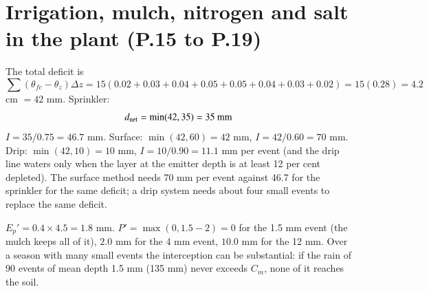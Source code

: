 \section{Irrigation, mulch, nitrogen and salt in the plant (P.15 to P.19)}
\sol {}\ans The total deficit is \[\sum(\theta_{fc}-\theta_z)\Delta z=15(0.02+0.03+0.04+0.05+0.05+0.04+0.03+0.02)=15(0.28)=4.2\] cm $=42$ mm. Sprinkler: \[d_{\rm net}=\min(42,35)=35\ \text{mm}\]
$I=35/0.75=46.7$ mm. Surface: $\min(42,60)=42$ mm, $I=42/0.60=70$ mm. Drip: $\min(42,10)=10$ mm, $I=10/0.90=11.1$ mm per event (and the drip line waters only when the layer at the emitter depth is at least 12 per cent depleted). The surface method needs 70 mm per event against 46.7 for the sprinkler for the same deficit; a drip system needs about four small events to replace the same deficit. \finans


\sol {}\ans $E_p'=0.4\times4.5=1.8$ mm. $P'=\max(0,1.5-2)=0$ for the 1.5 mm event (the mulch keeps all of it), $2.0$ mm for the 4 mm event, $10.0$ mm for the 12 mm. Over a season with many small events the interception can be substantial: if the rain of 90 events of mean depth 1.5 mm (135 mm) never exceeds $C_m$, none of it reaches the soil. \finans


